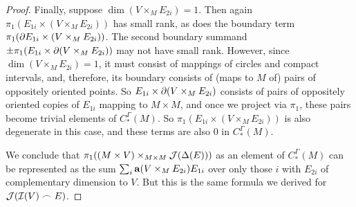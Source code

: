 \begin{proof}
Finally, suppose $\dim(V \times_M E_{2i}) = 1$. Then again $\pi_1(E_{1i} \times (V \times_M E_{2i}))$ has small rank, as does the boundary term $\pi_1(\partial E_{1i} \times (V \times_M E_{2i}))$. The second boundary summand $\pm\pi_1(E_{1i} \times \partial(V \times_M E_{2i}))$ may not have small rank. However, since $\dim(V \times_M E_{2i}) = 1$, it must consist of mappings of circles and compact intervals, and, therefore, its boundary consists of (maps to $M$ of) pairs of oppositely oriented points. So $E_{1i} \times \partial(V \times_M E_{2i})$ consists of pairs of oppositely oriented copies of $E_{1i}$ mapping to $M \times M$, and once we project via $\pi_1$, these pairs become trivial elements of $C^\Gamma_*(M)$. So $\pi_1(E_{1i} \times (V \times_M E_{2i}))$ is also degenerate in this case, and these terms are also $0$ in $C^\Gamma_*(M)$.

\begin{comment}

 We also have
$$\bd ( V \times_M E_{2i}) = \pm (\bd V) \times_M E_{2i}\pm V \times_M \bd E_{2i}$$.
Since $V$ is a cocycle, $\bd V$ is a union of trivial or small rank precochains, and hence so is $(\bd V) \times_M E_{2i}$ by Lemma \ref{L: pullback with Q}. If $\dim( V \times_M \bd E_{2i})>0$, then $\pi(V \times_M \bd E_{2i})$ has small rank. Finally, suppose $\dim (V \times_M \bd E_{2i}) = 0$. Then $\dim(V \times_M E_{2i}) = 1$. So $V \times_M E_{2i}$ consists of some number of circles and closed intervals in $E_{2i}$, and $V \times_M \bd E_{2i}$ will be the endpoints of those intervals. Since these must occur in pairs of opposite signs, then $E_{1i} \times (V \times_M \bd E_{2i})$ will consist of chains $\pm E_{1i} \times pt$, with the points being the points of $V \times_M \bd E_{2i}$. Since the points occur in oppositely signed pairs, under $\pi_1$ these pairs become trivial in $M$. Altogether then $\pi_1(\bd ( V \times_M E_{2i}))$ is a disjoint union of trivial and small rank precochains. So $V \times_M E_{2i} \in Q_*(M)$.
\end{comment}

We conclude that $\pi_1( (M \times V)\times_{M \times M}\mathcal{J}(\Delta(E)))$ as an element of $C_*^\Gamma(M)$ can be represented as the sum $\sum_i \mathbf{a}(V \times_M E_{2i})E_{1i}$ over only those $i$ with $E_{2i}$ of complementary dimension to $V$. But this is the same formula we derived for $\mathcal{J}(\mathcal{I}(V)\frown E)$.
\end{proof}

